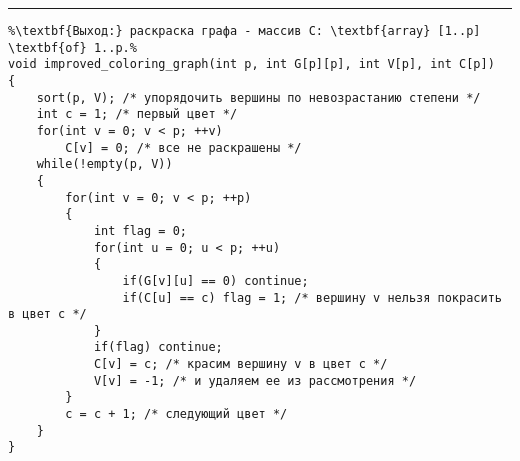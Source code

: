 \documentclass{article}
\begin{document}
\vspace{5pt} \hrule
\begin{lstlisting}[caption={Улучшенный алгоритм последовательного раскрашивания}, label=p360, escapechar=\%]
%\noindent\textbf{Вход:} граф G.\\%
%\textbf{Выход:} раскраска графа - массив C: \textbf{array} [1..p] \textbf{of} 1..p.%
void improved_coloring_graph(int p, int G[p][p], int V[p], int C[p])
{
	sort(p, V); /* упорядочить вершины по невозрастанию степени */
	int c = 1; /* первый цвет */
	for(int v = 0; v < p; ++v)
		C[v] = 0; /* все не раскрашены */
	while(!empty(p, V))
	{
		for(int v = 0; v < p; ++p)
		{
			int flag = 0;
			for(int u = 0; u < p; ++u)
			{
				if(G[v][u] == 0) continue;
				if(C[u] == c) flag = 1; /* вершину v нельзя покрасить в цвет c */
			}
			if(flag) continue;
			C[v] = c; /* красим вершину v в цвет c */
			V[v] = -1; /* и удаляем ее из рассмотрения */
		}
		c = c + 1; /* следующий цвет */
	}
}
\end{lstlisting}
\end{document}
